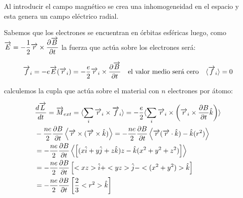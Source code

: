 Al introducir el campo magnético se crea una inhomogeneidad en el espacio y esta genera un campo eléctrico radial.

Sabemos que los electrones se encuentran en órbitas esféricas luego, como $\overrightarrow{E} = -\dfrac{1}{2}\overrightarrow{r} \times \dfrac{\partial \overrightarrow{B}}{\partial t}$ la fuerza que actúa sobre los electrones será:

\begin{equation}
	\overrightarrow{f}_{i}= -e\overrightarrow{E}(\overrightarrow{r}_{i}) = -\dfrac{e}{2}\overrightarrow{r}_{i} \times \dfrac{\partial \overrightarrow{B}}{\partial t} \quad \text{el valor medio será cero} \quad \langle\overrightarrow{f}_{i} \rangle = 0
\end{equation}

calculemos la cupla que actúa sobre el material con $n$ electrones por átomo:

\begin{equation}
\begin{aligned}
&\dfrac{d\overrightarrow{L}}{dt}=\overrightarrow{M}_{ext}= \langle \sum_{i} \overrightarrow{r}_{i} \times \overrightarrow{f}_{i} \rangle = -\dfrac{e}{2} \langle \sum_{i} \overrightarrow{r}_{i} \times \left(  \overrightarrow{r}_{i} \times \dfrac{\partial B}{\partial t} \hat{k} \right)   \rangle \\
&-\dfrac{ne}{2}\dfrac{\partial B}{\partial t}\left\langle \overrightarrow{r} \times ( \overrightarrow{r} \times \hat{k})\right\rangle =-\dfrac{ne}{2}\dfrac{\partial B}{\partial t}\left\langle \overrightarrow{r}(\overrightarrow{r}\cdot\hat{k})-\hat{k}(r^{2})\right\rangle\\
&=-\dfrac{ne}{2}\dfrac{\partial B}{\partial t}\left\langle \left[ (x\hat{i}+y\hat{j}+z\hat{k})z -\hat{k}(x^{2}+y^{2}+z^{2})\right]\right\rangle \\
&=-\dfrac{ne}{2}\dfrac{\partial B}{\partial t} \left[ <xz>\hat{i} + <yz>\hat{j} - <(x^{2}+y^{2})>\hat{k}  \right]\\
&=-\dfrac{ne}{2}\dfrac{\partial B}{\partial t} \left[ \dfrac{2}{3}<r^{2}>\hat{k}  \right]
\end{aligned}
\end{equation}










